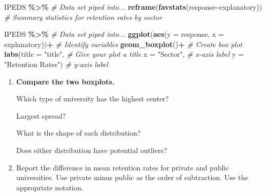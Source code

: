 \documentclass[
]{report}
\newenvironment{Shaded}{\begin{snugshade}}{\end{snugshade}}
\newcommand{\AttributeTok}[1]{\textcolor[rgb]{0.13,0.29,0.53}{#1}}
\newcommand{\CommentTok}[1]{\textcolor[rgb]{0.56,0.35,0.01}{\textit{#1}}}
\newcommand{\FunctionTok}[1]{\textcolor[rgb]{0.13,0.29,0.53}{\textbf{#1}}}
\newcommand{\NormalTok}[1]{#1}
\newcommand{\SpecialCharTok}[1]{\textcolor[rgb]{0.81,0.36,0.00}{\textbf{#1}}}
\newcommand{\StringTok}[1]{\textcolor[rgb]{0.31,0.60,0.02}{#1}}
\begin{document}
\begin{Shaded}
\begin{Highlighting}[]
\NormalTok{IPEDS }\SpecialCharTok{\%\textgreater{}\%}  \CommentTok{\# Data set piped into...}
  \FunctionTok{reframe}\NormalTok{(}\FunctionTok{favstats}\NormalTok{(response}\SpecialCharTok{\textasciitilde{}}\NormalTok{explanatory)) }\CommentTok{\# Summary statistics for retention rates by sector}
\end{Highlighting}
\end{Shaded}

\begin{Shaded}
\begin{Highlighting}[]
\NormalTok{IPEDS }\SpecialCharTok{\%\textgreater{}\%}  \CommentTok{\# Data set piped into...}
  \FunctionTok{ggplot}\NormalTok{(}\FunctionTok{aes}\NormalTok{(}\AttributeTok{y =}\NormalTok{ response, }\AttributeTok{x =}\NormalTok{ explanatory))}\SpecialCharTok{+}  \CommentTok{\# Identify variables}
  \FunctionTok{geom\_boxplot}\NormalTok{()}\SpecialCharTok{+}  \CommentTok{\# Create box plot}
  \FunctionTok{labs}\NormalTok{(}\AttributeTok{title =} \StringTok{"title"}\NormalTok{,  }\CommentTok{\# Give your plot a title}
       \AttributeTok{x =} \StringTok{"Sector"}\NormalTok{,    }\CommentTok{\# x{-}axis label}
       \AttributeTok{y =} \StringTok{"Retention Rates"}\NormalTok{)  }\CommentTok{\# y{-}axis label}
\end{Highlighting}
\end{Shaded}

\begin{enumerate}
\def\labelenumi{\arabic{enumi}.}
\setcounter{enumi}{12}
\item
  \textbf{Compare the two boxplots.}

  Which type of university has the highest center?
  \vspace{0.3in}

  Largest spread?
  \vspace{0.3in}

  What is the shape of each distribution?
  \vspace{0.3in}

  Does either distribution have potential outliers?
  \vspace{0.3in}
\item
  Report the difference in mean retention rates for private and public universities. Use private minus public as the order of subtraction. Use the appropriate notation.
\end{enumerate}
\end{document}
